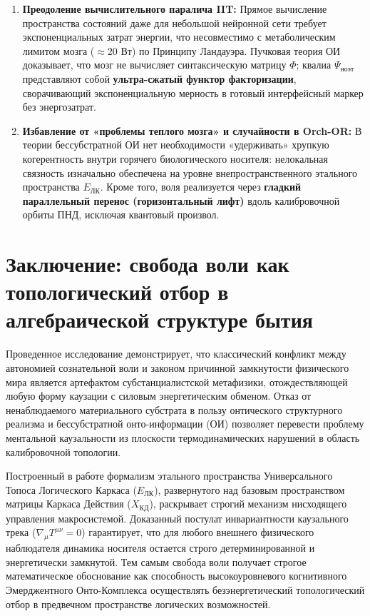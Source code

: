 \documentclass[12pt,a4paper]{article}
\begin{document}
\begin{enumerate}
    \item \textbf{Преодоление вычислительного паралича IIT:} Прямое вычисление пространства состояний даже для небольшой нейронной сети требует экспоненциальных затрат энергии, что несовместимо с метаболическим лимитом мозга ($\approx 20\text{ Вт}$) по Принципу Ландауэра. Пучковая теория ОИ доказывает, что мозг не вычисляет синтаксическую матрицу $\Phi$; квалиа $\Psi_{\text{ноэт}}$ представляют собой \textbf{ультра-сжатый функтор факторизации}, сворачивающий экспоненциальную мерность в готовый интерфейсный маркер без энергозатрат.
    \item \textbf{Избавление от «проблемы теплого мозга» и случайности в Orch-OR:} В теории бессубстратной ОИ нет необходимости «удерживать» хрупкую когерентность внутри горячего биологического носителя: нелокальная связность изначально обеспечена на уровне внепространственного этального пространства $E_{\text{ЛК}}$. Кроме того, воля реализуется через \textbf{гладкий параллельный перенос (горизонтальный лифт)} вдоль калибровочной орбиты ПНД, исключая квантовый произвол.
\end{enumerate}

\section{Заключение: свобода воли как топологический отбор в алгебраической структуре бытия}

Проведенное исследование демонстрирует, что классический конфликт между автономией сознательной воли и законом причинной замкнутости физического мира является артефактом субстанциалистской метафизики, отождествляющей любую форму каузации с силовым энергетическим обменом. Отказ от ненаблюдаемого материального субстрата в пользу онтического структурного реализма и бессубстратной онто-информации (ОИ) позволяет перевести проблему ментальной каузальности из плоскости термодинамических нарушений в область калибровочной топологии.

Построенный в работе формализм этального пространства Универсального Топоса Логического Каркаса ($E_{\text{ЛК}}$), развернутого над базовым пространством матрицы Каркаса Действия ($X_{\text{КД}}$), раскрывает строгий механизм нисходящего управления макросистемой. Доказанный постулат инвариантности каузального трека ($\nabla_\mu T^{\mu\nu} = 0$) гарантирует, что для любого внешнего физического наблюдателя динамика носителя остается строго детерминированной и энергетически замкнутой. Тем самым свобода воли получает строгое математическое обоснование как способность высокоуровневого когнитивного Эмерджентного Онто-Комплекса осуществлять безэнергетический топологический отбор в предвечном пространстве логических возможностей.
\end{document}
